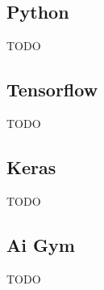 \subsection{Python}
\colorbox{red!30}{TODO}
\subsection{Tensorflow}
\colorbox{red!30}{TODO}
\subsection{Keras}
\colorbox{red!30}{TODO}
\subsection{Ai Gym}
\colorbox{red!30}{TODO}